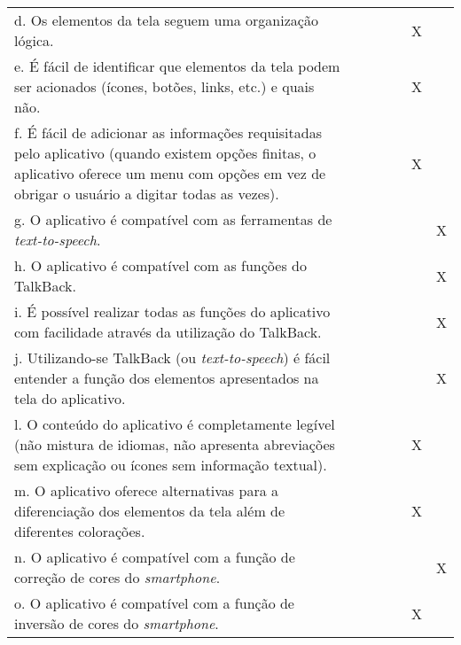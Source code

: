 \documentclass[portuguese,oneside]{tcc}
\begin{document}
\begin{center}
\begin{longtabu}{|L{25em}|c|c|c|c|c|c|}
	d. Os elementos da tela seguem uma organização lógica. & & & & & X & \\ 
	e. É fácil de identificar que elementos da tela podem ser acionados (ícones, botões, links, etc.) e quais não. & & & & & X & \\ 
	f. É fácil de adicionar as informações requisitadas pelo aplicativo (quando existem opções finitas, o aplicativo oferece um menu com opções em vez de obrigar o usuário a digitar todas as vezes). & & & & & X & \\ 
	g. O aplicativo é compatível com as ferramentas de \emph{text-to-speech}. & & & & & & X \\ 
	h. O aplicativo é compatível com as funções do TalkBack. & & & & & & X \\ 
	i. É possível realizar todas as funções do aplicativo com facilidade através da utilização do TalkBack.	& & & & & & X \\ 
	j. Utilizando-se TalkBack (ou \emph{text-to-speech}) é fácil entender a função dos elementos apresentados na tela do aplicativo. & & & & & & X \\ 
	l. O conteúdo do aplicativo é completamente legível (não mistura de idiomas, não apresenta abreviações sem explicação ou ícones sem informação textual). & & & & & X & \\ 
	m. O aplicativo oferece alternativas para a diferenciação dos elementos da tela além de diferentes colorações. & & & & & X & \\ 
	n. O aplicativo é compatível com a função de correção de cores do \emph{smartphone}. & & & & & & X \\ 
	o. O aplicativo é compatível com a função de inversão de cores do \emph{smartphone}. & & & & & X & \\ 
\end{longtabu}
\end{center}
\end{document}
